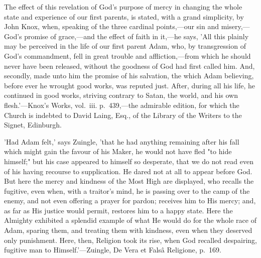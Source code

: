 \documentclass[
]{book}
\begin{document}
{  The effect of this revelation of God's purpose of mercy in changing the whole state and experience of our first parents, is stated, with a grand simplicity, by John Knox, when, speaking of the three cardinal points,---our sin and misery,---God's promise of grace,---and the effect of faith in it,---he says, 'All this plainly may be perceived in the life of our first parent Adam, who, by transgression of God's commandment, fell in great trouble and affliction,---from which he should never have been released, without the goodness of God had first called him. And, secondly, made unto him the promise of his salvation, the which Adam believing, before ever he wrought good works, was reputed just. After, during all his life, he continued in good works, striving contrary to Satan, the world, and his own flesh.'---Knox's Works, vol.~iii. p.~439,---the admirable edition, for which the Church is indebted to David Laing, Esq., of the Library of the Writers to the Signet, Edinburgh.

  'Had Adam felt,' says Zuingle, 'that he had anything remaining after his fall which might gain the favour of his Maker, he would not have fled "to hide himself;" but his case appeared to himself so desperate, that we do not read even of his having recourse to supplication. He dared not at all to appear before God. But here the mercy and kindness of the Most High are displayed, who recalls the fugitive, even when, with a traitor's mind, he is passing over to the camp of the enemy, and not even offering a prayer for pardon; receives him to His mercy; and, as far as His justice would permit, restores him to a happy state. Here the Almighty exhibited a splendid example of what He would do for the whole race of Adam, sparing them, and treating them with kindness, even when they deserved only punishment. Here, then, Religion took its rise, when God recalled despairing, fugitive man to Himself.'---Zuingle, De Vera et Falsâ Religione, p.~169.

}
\end{document}
